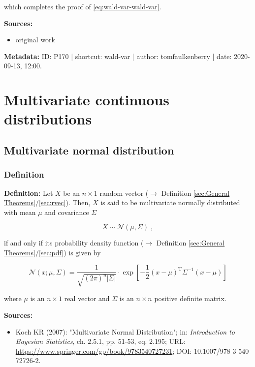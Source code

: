 \documentclass[a4paper,12pt,twoside]{book}
\begin{document}
which completes the proof of \eqref{eq:wald-var-wald-var}.


\vspace{1em}
\textbf{Sources:}
\begin{itemize}
\item original work\end{itemize}


\vspace{1em}
\textbf{Metadata:} ID: P170 | shortcut: wald-var | author: tomfaulkenberry | date: 2020-09-13, 12:00.
\vspace{1em}



\pagebreak
\section{Multivariate continuous distributions}

\subsection{Multivariate normal distribution}

\subsubsection[\textit{Definition}]{Definition} \label{sec:mvn}
\setcounter{equation}{0}

\textbf{Definition:} Let $X$ be an $n \times 1$ random vector ($\rightarrow$ Definition \ref{sec:General Theorems}/\ref{sec:rvec}). Then, $X$ is said to be multivariate normally distributed with mean $\mu$ and covariance $\Sigma$

\begin{equation} \label{eq:mvn-mvn}
X \sim \mathcal{N}(\mu, \Sigma) \; ,
\end{equation}

if and only if its probability density function ($\rightarrow$ Definition \ref{sec:General Theorems}/\ref{sec:pdf}) is given by

\begin{equation} \label{eq:mvn-mvn-pdf}
\mathcal{N}(x; \mu, \Sigma) = \frac{1}{\sqrt{(2 \pi)^n |\Sigma|}} \cdot \exp \left[ -\frac{1}{2} (x-\mu)^\mathrm{T} \Sigma^{-1} (x-\mu) \right]
\end{equation}

where $\mu$ is an $n \times 1$ real vector and $\Sigma$ is an $n \times n$ positive definite matrix.


\vspace{1em}
\textbf{Sources:}
\begin{itemize}
\item Koch KR (2007): "Multivariate Normal Distribution"; in: \textit{Introduction to Bayesian Statistics}, ch. 2.5.1, pp. 51-53, eq. 2.195; URL: \url{https://www.springer.com/gp/book/9783540727231}; DOI: 10.1007/978-3-540-72726-2.
\end{itemize}
\end{document}
